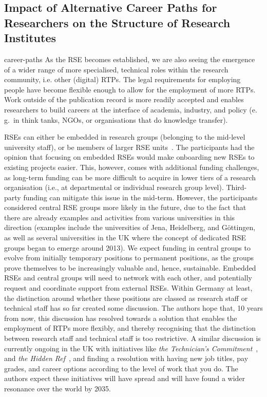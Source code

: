 \documentclass{eceasst}
\newcommand{\eg}{e.\,g.}
\begin{document}
\subsection{Impact of Alternative Career Paths for Researchers on the Structure of Research Institutes}
\begin{whatis}{}{career-paths}
As the RSE becomes established, we are also seeing the emergence of a wider range of more specialised, technical roles within the research community, i.e. other (digital) RTPs.
The legal requirements for employing people have become flexible enough to allow for the employment of more RTPs.
Work outside of the publication record is more readily accepted and enables researchers to build careers at the interface of academia, industry, and policy
(\eg\ in think tanks, NGOs, or organisations that do knowledge transfer).
\end{whatis}
RSEs can either be embedded in research groups (belonging to the mid-level university staff),
or be members of larger RSE units~\cite{Kempf2025-draft}.
The participants had the opinion that focusing on embedded RSEs would make onboarding new RSEs to existing projects easier.
This, however, comes with additional funding challenges,
as long-term funding can be more difficult to acquire in lower tiers of a research organisation (i.e., at departmental or individual research group level).
Third-party funding can mitigate this issue in the mid-term.
However, the participants considered central RSE groups more likely in the future,
due to the fact that there are already examples and activities from various universities in this direction
(examples include the universities of Jena, Heidelberg, and Göttingen, as well as several universities
in the UK where the concept of dedicated RSE groups began to emerge around 2013).
We expect funding in central groups to evolve from initially temporary positions to permanent positions,
as the groups prove themselves to be increasingly valuable and, hence, sustainable.
Embedded RSEs and central groups will need to network with each other,
and potentially request and coordinate support from external RSEs.
Within Germany at least, the distinction around whether these positions are classed as research staff or technical staff has so far created some discussion.
The authors hope that, 10 years from now, this discussion has resolved towards a solution that enables the employment of RTPs more flexibly,
and thereby recognising that the distinction between research staff and technical staff is too restrictive.
A similar discussion is currently ongoing in the UK with initiatives like \emph{the Technician's Commitment}~\cite{techniciancommitment}, and \emph{the Hidden Ref}~\cite{hiddenref},
and finding a resolution with having new job titles, pay grades, and career options according to the level of work that you do.
The authors expect these initiatives will have spread and will have found a wider resonance over the world by 2035.
\end{document}
